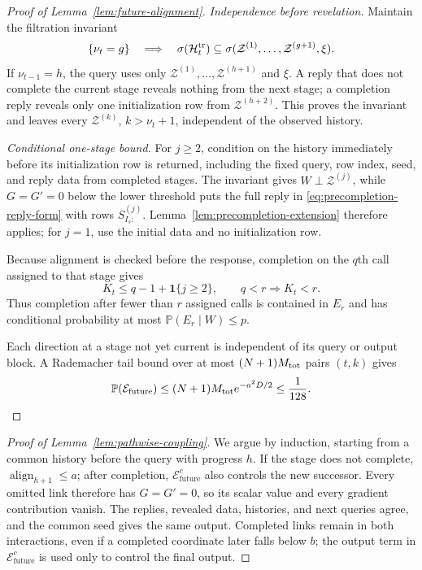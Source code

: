 \documentclass{article}
\theoremstyle{definition}
\newcommand{\Prob}{\mathbb{P}}
\newcommand{\cZ}{\mathcal{Z}}
\newcommand{\cEfuture}{\mathcal{E}_{\mathrm{future}}}
\begin{document}
\begin{proof}[Proof of Lemma~\ref{lem:future-alignment}]
\emph{Independence before revelation.}
Maintain the filtration invariant
\begin{equation}
 \{\nu_t=g\}
 \quad\Longrightarrow\quad
 \sigma(\mathcal H_t^{\rm tr})\subseteq
 \sigma(\cZ^{(1)},\ldots,\cZ^{(g+1)},\xi).
 \label{eq:active-filtration-invariant}
\end{equation}
If $\nu_{t-1}=h$, the query uses only
$\cZ^{(1)},\ldots,\cZ^{(h+1)}$ and $\xi$.  A reply that does not complete the
current stage reveals nothing from the next stage; a completion reply reveals
only one initialization row from $\cZ^{(h+2)}$.  This
proves the invariant and leaves every $\cZ^{(k)}$, $k>\nu_t+1$, independent of
the observed history.

\emph{Conditional one-stage bound.}
For $j\ge2$, condition on the history immediately before its initialization
row is returned, including the fixed query, row index, seed, and reply data
from completed stages.
The invariant gives $W\perp\cZ^{(j)}$, while $G=G'=0$ below the lower threshold
puts the full reply in
\eqref{eq:precompletion-reply-form} with rows $S^{(j)}_{I_s:}$.
Lemma~\ref{lem:precompletion-extension}
therefore applies; for $j=1$, use the initial data and no initialization row.

Because alignment is checked before the response, completion on the $q$th call
assigned to that stage gives
\[
 K_t\le q-1+\mathbf 1\{j\ge2\},
 \qquad q<r\Longrightarrow K_t<r.
\]
Thus completion after fewer than $r$ assigned calls is contained in $E_r$ and has
conditional probability at most $\Prob(E_r\mid W)\le p$.

Each direction at a stage not yet current is independent of its query or output
block.  A
Rademacher tail bound over at most $(N+1)M_{\rm tot}$ pairs $(t,k)$ gives
\[
 \Prob(\cEfuture)
 \le (N+1)M_{\rm tot}e^{-a^2D/2}
 \le\frac1{128}.
\]
\end{proof}

\begin{proof}[Proof of Lemma~\ref{lem:pathwise-coupling}]
We argue by induction, starting from a common history before the query with
progress $h$.  If the stage
does not complete, $\operatorname{align}_{h+1}\le a$; after completion,
$\cEfuture^c$ also controls the new successor.
Every omitted link therefore has $G=G'=0$, so its scalar value and every
gradient contribution vanish.  The replies, revealed data, histories, and next
queries agree, and the common seed gives the same output.  Completed links
remain in both interactions, even if a completed coordinate later falls below
$b$; the output term in $\cEfuture^c$ is used only to control the final output.
\end{proof}
\end{document}
